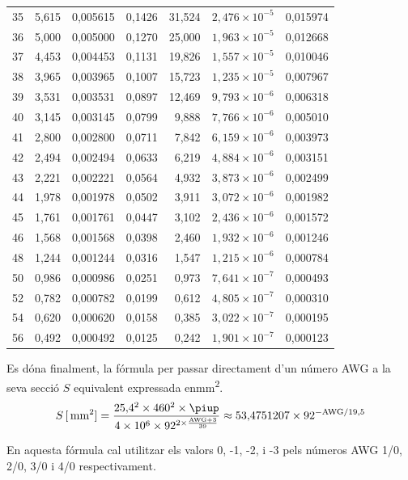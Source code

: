 \begin{longtable}{crrrrrr}
35 &      5,615 &   0,005615 &     0,1426 &     31,524 &  $2{,}476\times 10^{-5}$ &   0,015974 \\
36 &      5,000 &   0,005000 &     0,1270 &     25,000 &  $1{,}963\times 10^{-5}$ &   0,012668 \\
37 &      4,453 &   0,004453 &     0,1131 &     19,826 &  $1{,}557\times 10^{-5}$ &   0,010046 \\
38 &      3,965 &   0,003965 &     0,1007 &     15,723 &  $1{,}235\times 10^{-5}$ &   0,007967 \\
39 &      3,531 &   0,003531 &     0,0897 &     12,469 &  $9{,}793\times 10^{-6}$ &   0,006318 \\
40 &      3,145 &   0,003145 &     0,0799 &      9,888 &  $7{,}766\times 10^{-6}$ &   0,005010 \\
41 &      2,800 &   0,002800 &     0,0711 &      7,842 &  $6{,}159\times 10^{-6}$ &   0,003973 \\
42 &      2,494 &   0,002494 &     0,0633 &      6,219 &  $4{,}884\times 10^{-6}$ &   0,003151 \\
43 &      2,221 &   0,002221 &     0,0564 &      4,932 &  $3{,}873\times 10^{-6}$ &   0,002499 \\
44 &      1,978 &   0,001978 &     0,0502 &      3,911 &  $3{,}072\times 10^{-6}$ &   0,001982 \\
45 &      1,761 &   0,001761 &     0,0447 &      3,102 &  $2{,}436\times 10^{-6}$ &   0,001572 \\
46 &      1,568 &   0,001568 &     0,0398 &      2,460 &  $1{,}932\times 10^{-6}$ &   0,001246 \\
48 &      1,244 &   0,001244 &     0,0316 &      1,547 &  $1{,}215\times 10^{-6}$ &   0,000784 \\
50 &      0,986 &   0,000986 &     0,0251 &      0,973 &  $7{,}641\times 10^{-7}$ &   0,000493 \\
52 &      0,782 &   0,000782 &     0,0199 &      0,612 &  $4{,}805\times 10^{-7}$ &   0,000310 \\
54 &      0,620 &   0,000620 &     0,0158 &      0,385 &  $3{,}022\times 10^{-7}$ &   0,000195 \\
56 &      0,492 &   0,000492 &     0,0125 &      0,242 &  $1{,}901\times 10^{-7}$ &   0,000123 \\

\bottomrule[1pt]
\end{longtable}

 Es d\'{o}na finalment, la f\'{o}rmula per passar directament d'un n\'{u}mero AWG a la seva secci\'{o} $S$ equivalent expressada en\unit{mm^2}.
\begin{equation}
   S \,[\unit{mm^2}]= \frac{25{,}4^2 \times 460^2 \times \piup}{4 \times 10^6 \times 92^{2\times\frac{\text{AWG}+3}{39}}} \approx
   53{,}4751207 \times 92^{-\text{AWG}/19{,}5}\label{eq:awg_mm2}
\end{equation}

En aquesta f\'{o}rmula cal utilitzar els valors 0, -1, -2, i -3  pels n\'{u}meros AWG 1/0,
2/0, 3/0 i 4/0 respectivament.
